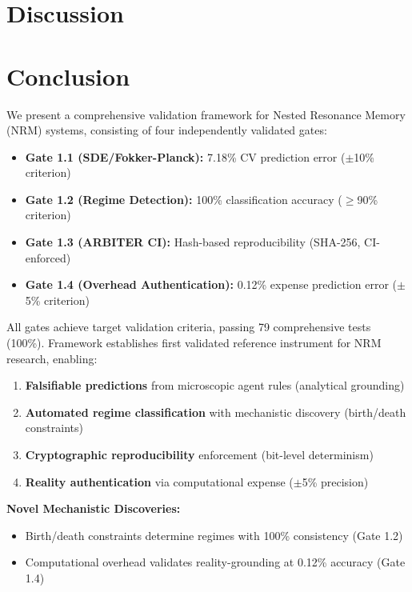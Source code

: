 \documentclass[11pt]{article}
\begin{document}
\section{Discussion}



\section{Conclusion}

We present a comprehensive validation framework for Nested Resonance Memory (NRM) systems, consisting of four independently validated gates:

\begin{itemize}
\item \textbf{Gate 1.1 (SDE/Fokker-Planck):} 7.18\% CV prediction error ($\pm$10\% criterion)
\item \textbf{Gate 1.2 (Regime Detection):} 100\% classification accuracy ($\geq$90\% criterion)
\item \textbf{Gate 1.3 (ARBITER CI):} Hash-based reproducibility (SHA-256, CI-enforced)
\item \textbf{Gate 1.4 (Overhead Authentication):} 0.12\% expense prediction error ($\pm$5\% criterion)
\end{itemize}

All gates achieve target validation criteria, passing 79 comprehensive tests (100\%). Framework establishes first validated reference instrument for NRM research, enabling:

\begin{enumerate}
\item \textbf{Falsifiable predictions} from microscopic agent rules (analytical grounding)
\item \textbf{Automated regime classification} with mechanistic discovery (birth/death constraints)
\item \textbf{Cryptographic reproducibility} enforcement (bit-level determinism)
\item \textbf{Reality authentication} via computational expense ($\pm$5\% precision)
\end{enumerate}

\textbf{Novel Mechanistic Discoveries:}
\begin{itemize}
\item Birth/death constraints determine regimes with 100\% consistency (Gate 1.2)
\item Computational overhead validates reality-grounding at 0.12\% accuracy (Gate 1.4)
\end{itemize}
\end{document}
